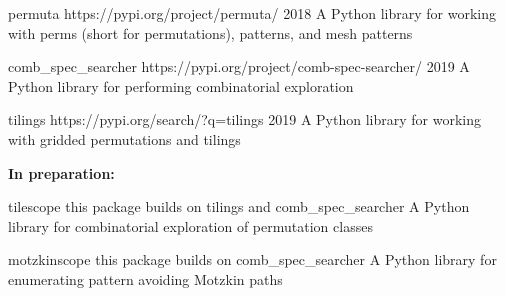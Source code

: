


\begin{cvhonors}

\cvhonor
  {permuta} %
  {{https://pypi.org/project/permuta/}} %
  {2018} %
  {A Python library for working with perms (short for permutations), patterns, and mesh patterns} %



\cvhonor
  {comb\_spec\_searcher} %
  {{https://pypi.org/project/comb-spec-searcher/}} %
  {2019} %
  {A Python library for performing combinatorial exploration} %



\cvhonor
  {tilings} %
  {https://pypi.org/search/?q=tilings} %
  {2019} %
  {A Python library for working with gridded permutations and tilings} %


\begin{flushleft}
  \textbf{In preparation:}
\end{flushleft}


\cvhonor
  {tilescope} %
  {this package builds on tilings and comb\_spec\_searcher} %
  {} %
  {A Python library for combinatorial exploration of permutation classes} %



\cvhonor
  {motzkinscope} %
  {this package builds on comb\_spec\_searcher} %
  {} %
  {A Python library for enumerating pattern avoiding Motzkin paths} %


\end{cvhonors}
